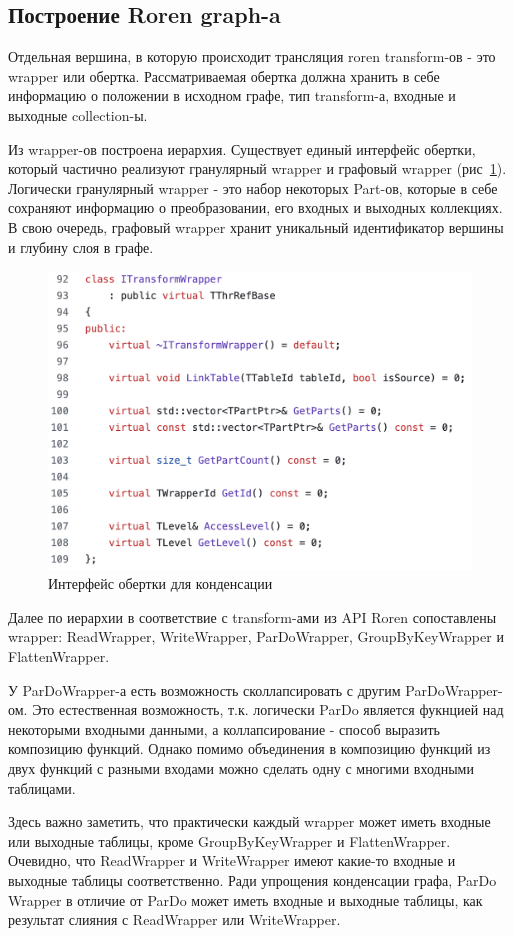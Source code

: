 \subsection{Построение Roren graph-a}

Отдельная вершина, в которую происходит трансляция roren transform-ов - это wrapper или обертка. Рассматриваемая обертка должна хранить в себе информацию о положении в исходном графе, тип transform-а, входные и выходные collection-ы.

Из wrapper-ов построена иерархия. Существует единый интерфейс обертки, который частично реализуют гранулярный wrapper и графовый wrapper (рис~\ref{fig:iwrapper}). Логически гранулярный wrapper - это набор некоторых Part-ов, которые в себе сохраняют информацию о преобразовании, его входных и выходных коллекциях. В свою очередь, графовый wrapper хранит уникальный идентификатор вершины и глубину слоя в графе.

\begin{figure}[h]
    \centering
    \includegraphics[width=\textwidth]{img/iwrapper.png}
    \caption{Интерфейс обертки для конденсации}
    \label{fig:iwrapper}
\end{figure}

Далее по иерархии в соответствие с transform-ами из API Roren сопоставлены wrapper: ReadWrapper, WriteWrapper, ParDoWrapper, GroupByKeyWrapper и FlattenWrapper.

У ParDoWrapper-а есть возможность сколлапсировать с другим ParDoWrapper-ом. Это естественная возможность, т.к. логически ParDo является фукнцией над некоторыми входными данными, а коллапсирование - способ выразить композицию функций. Однако помимо объединения в композицию функций из двух функций с разными входами можно сделать одну с многими входными таблицами.

Здесь важно заметить, что практически каждый wrapper может иметь входные или выходные таблицы, кроме GroupByKeyWrapper и FlattenWrapper. Очевидно, что ReadWrapper и WriteWrapper имеют какие-то входные и выходные таблицы соответственно. Ради упрощения конденсации графа, ParDo Wrapper в отличие от ParDo может иметь входные и выходные таблицы, как результат слияния с ReadWrapper или WriteWrapper.
